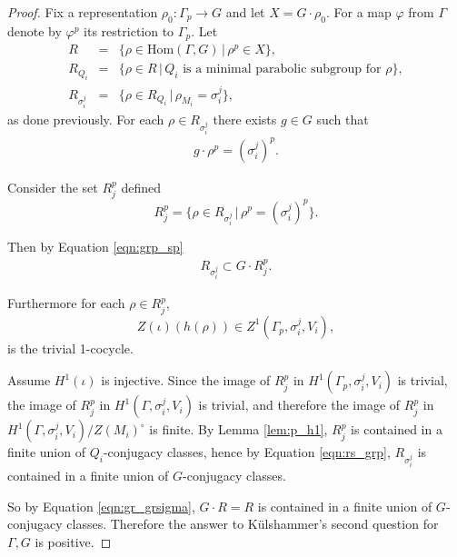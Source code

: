 \begin{proof}
  Fix a representation $\rho_0: \Gamma_p \rightarrow G$ and let $X = G \cdot \rho_0$. For a map $\varphi$ from $\Gamma$ denote by $\varphi^p$ its restriction to $\Gamma_p$. Let
  \begin{eqnarray*}
    R &=&  \{ \rho \in \textrm{Hom}(\Gamma, G) \,|\, \rho^p \in X\}, \\
    R_{Q_i} &=&  \{ \rho \in R \,|\, Q_i \textrm{ is a minimal parabolic subgroup for } \rho \}, \\
    R_{\sigma_i^j} &=&  \{ \rho \in R_{Q_i} \,|\, \rho_{M_i} = \sigma_i^j \},
  \end{eqnarray*}
  as done previously. For each $\rho \in R_{\sigma_i^j}$ there exists $g \in G$ such that
  \begin{eqnarray}
    g \cdot \rho^p = (\sigma_i^j)^p.
    \label{eqn:grp_sp}
  \end{eqnarray}
  
  Consider the set $R_j^p$ defined
  \begin{displaymath}
    R_j^p = \{ \rho \in R_{\sigma_i^j} \,|\, \rho^p = ( \sigma_i^j )^p \}.
  \end{displaymath}

  Then by Equation \ref{eqn:grp_sp}
  \begin{eqnarray}
    R_{\sigma_i^j} \subset G \cdot R_j^p.
    \label{eqn:rs_grp}
  \end{eqnarray}

  Furthermore for each $\rho \in R_j^p$, 
  \begin{displaymath}
    Z(\iota)(h(\rho)) \in Z^1(\Gamma_p, \sigma_i^j, V_i),
  \end{displaymath}
  is the trivial 1-cocycle.

  Assume $H^1(\iota)$ is injective. Since the image of $R_j^p$ in $H^1(\Gamma_p, \sigma_i^j, V_i)$ is trivial, the image of $R_j^p$ in $H^1(\Gamma, \sigma_i^j, V_i)$ is trivial, and therefore the image of $R_j^p$ in $H^1(\Gamma, \sigma_i^j, V_i)/Z(M_i)^\circ$ is finite. By Lemma \ref{lem:p_h1}, $R_j^p$ is contained in a finite union of $Q_i$-conjugacy classes, hence by Equation \ref{eqn:rs_grp}, $R_{\sigma_i^j}$ is contained in a finite union of $G$-conjugacy classes.

  So by Equation \ref{eqn:gr_grsigma}, $G \cdot R = R$ is contained in a finite union of $G$-conjugacy classes. Therefore the answer to K\"ulshammer's second question for $\Gamma, G$ is positive.


\end{proof}
